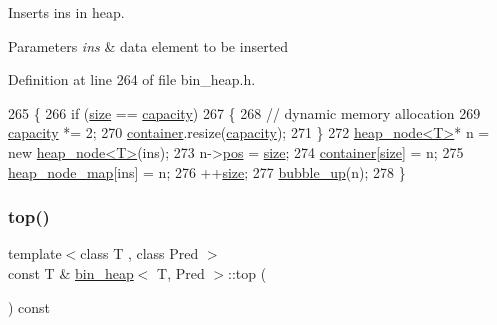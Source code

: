 Inserts {\ttfamily ins} in heap. 


\begin{DoxyParams}{Parameters}
{\em ins} & data element to be inserted \\
\hline
\end{DoxyParams}


Definition at line 264 of file bin\+\_\+heap.\+h.


\begin{DoxyCode}
265 \{
266     \textcolor{keywordflow}{if} (\mbox{\hyperlink{classbin__heap_a8dde1008dcc24d734dbdb2c7ca50435b}{size}} == \mbox{\hyperlink{classbin__heap_ac5aa6948898bfc047cae2fe99ba28f57}{capacity}})
267     \{
268      \textcolor{comment}{// dynamic memory allocation}
269     \mbox{\hyperlink{classbin__heap_ac5aa6948898bfc047cae2fe99ba28f57}{capacity}} *= 2;
270     \mbox{\hyperlink{classbin__heap_a413200f4c6e24090c5e9a32184fc8857}{container}}.resize(\mbox{\hyperlink{classbin__heap_ac5aa6948898bfc047cae2fe99ba28f57}{capacity}});
271     \}
272     \mbox{\hyperlink{classheap__node}{heap\_node<T>}}* n = \textcolor{keyword}{new} \mbox{\hyperlink{classheap__node}{heap\_node<T>}}(ins);
273     n->\mbox{\hyperlink{classheap__node_a6d6ebca320ede4a2dc3749caf0519534}{pos}} = \mbox{\hyperlink{classbin__heap_a8dde1008dcc24d734dbdb2c7ca50435b}{size}};
274     \mbox{\hyperlink{classbin__heap_a413200f4c6e24090c5e9a32184fc8857}{container}}[\mbox{\hyperlink{classbin__heap_a8dde1008dcc24d734dbdb2c7ca50435b}{size}}] = n;
275     \mbox{\hyperlink{classbin__heap_ab646175f97b352ca26587d23bf57c79f}{heap\_node\_map}}[ins] = n;
276     ++\mbox{\hyperlink{classbin__heap_a8dde1008dcc24d734dbdb2c7ca50435b}{size}};
277     \mbox{\hyperlink{classbin__heap_aefc41dde4f1decfe523d23eb3d5e885f}{bubble\_up}}(n);
278 \}
\end{DoxyCode}
\mbox{\label{classbin__heap_acd711ddeafe82630f153906da7e8fa1c}} 
\subsubsection{\texorpdfstring{top()}{top()}}
{\footnotesize\ttfamily template$<$class T , class Pred $>$ \\
const T \& \mbox{\hyperlink{classbin__heap}{bin\+\_\+heap}}$<$ T, Pred $>$\+::top (\begin{DoxyParamCaption}{ }\end{DoxyParamCaption}) const}




